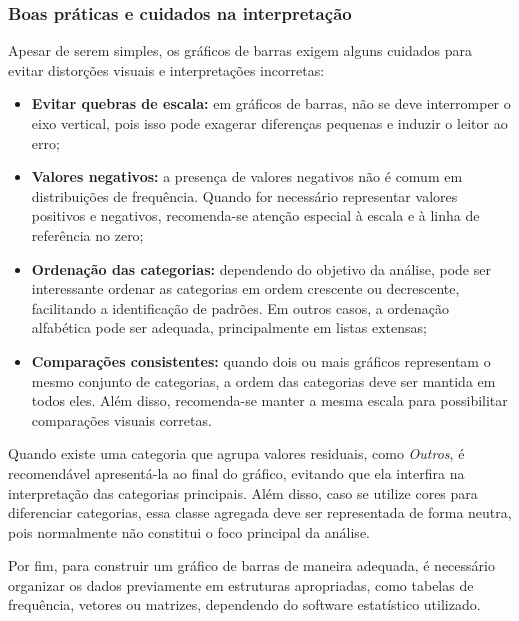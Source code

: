 \newpage
\subsubsection{Boas práticas e cuidados na interpretação}

Apesar de serem simples, os gráficos de barras exigem alguns cuidados para
evitar distorções visuais e interpretações incorretas:

\begin{itemize}
    \item \textbf{Evitar quebras de escala:} em gráficos de barras, não se deve
    interromper o eixo vertical, pois isso pode exagerar diferenças pequenas e
    induzir o leitor ao erro;
    \item \textbf{Valores negativos:} a presença de valores negativos não é
    comum em distribuições de frequência. Quando for necessário representar
    valores positivos e negativos, recomenda-se atenção especial à escala e à
    linha de referência no zero;
    \item \textbf{Ordenação das categorias:} dependendo do objetivo da análise,
    pode ser interessante ordenar as categorias em ordem crescente ou decrescente,
    facilitando a identificação de padrões. Em outros casos, a ordenação
    alfabética pode ser adequada, principalmente em listas extensas;
    \item \textbf{Comparações consistentes:} quando dois ou mais gráficos
    representam o mesmo conjunto de categorias, a ordem das categorias deve ser
    mantida em todos eles. Além disso, recomenda-se manter a mesma escala para
    possibilitar comparações visuais corretas.
\end{itemize}

Quando existe uma categoria que agrupa valores residuais, como \textit{Outros},
é recomendável apresentá-la ao final do gráfico, evitando que ela interfira na
interpretação das categorias principais. Além disso, caso se utilize cores para
diferenciar categorias, essa classe agregada deve ser representada de forma
neutra, pois normalmente não constitui o foco principal da análise. \vskip0.4cm

Por fim, para construir um gráfico de barras de maneira adequada, é necessário
organizar os dados previamente em estruturas apropriadas, como tabelas de
frequência, vetores ou matrizes, dependendo do software estatístico utilizado.



